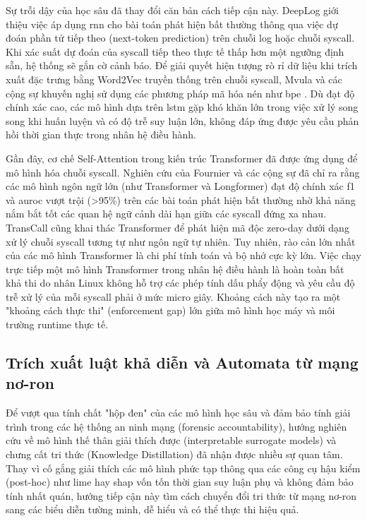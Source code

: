 \documentclass[../main.tex]{subfiles}
\begin{document}
Sự trỗi dậy của học sâu đã thay đổi căn bản cách tiếp cận này.
DeepLog \cite{du2017deeplog} giới thiệu việc áp dụng \gls{rnn} \cite{hochreiter1997lstm} cho bài toán phát hiện bất thường thông qua việc dự
đoán phần tử tiếp theo (next-token prediction) trên chuỗi log hoặc
chuỗi \gls{syscall}. Khi xác suất dự đoán của \gls{syscall} tiếp theo thực tế
thấp hơn một ngưỡng định sẵn, hệ thống sẽ gắn cờ cảnh báo. Để giải
quyết hiện tượng rò rỉ dữ liệu khi trích xuất đặc trưng bằng Word2Vec
\cite{mikolov2013word2vec} truyền thống trên chuỗi \gls{syscall}, Mvula và các cộng sự
\cite{mvula2023evaluating} khuyến nghị sử dụng các phương pháp mã hóa
nén như \gls{bpe} \cite{sennrich2016bpe}. Dù đạt độ chính xác cao, các mô
hình dựa trên \gls{lstm} gặp khó khăn lớn trong việc xử lý song song khi
huấn luyện và có độ trễ suy luận lớn, không đáp ứng được yêu cầu phản
hồi thời gian thực trong nhân hệ điều hành.

Gần đây, cơ chế Self-Attention trong kiến trúc Transformer đã được
ứng dụng để mô hình hóa chuỗi \gls{syscall}. Nghiên cứu của Fournier và các
cộng sự \cite{fournier2023language} đã chỉ ra rằng các mô hình ngôn
ngữ lớn (như Transformer và Longformer) đạt độ chính xác \gls{f1} và \gls{auroc}
vượt trội (>95\%) trên các bài toán phát hiện bất thường nhờ khả năng
nắm bắt tốt các quan hệ ngữ cảnh dài hạn giữa các \gls{syscall} đứng xa
nhau. TransCall \cite{alsiam2026transcall} cũng khai thác Transformer
để phát hiện mã độc zero-day dưới dạng xử lý chuỗi \gls{syscall} tương tự
như ngôn ngữ tự nhiên. Tuy nhiên, rào cản lớn nhất của các mô hình
Transformer là chi phí tính toán và bộ nhớ cực kỳ lớn. Việc chạy trực
tiếp một mô hình Transformer trong nhân hệ điều hành là hoàn toàn bất
khả thi do nhân Linux không hỗ trợ các phép tính dấu phẩy động và yêu
cầu độ trễ xử lý của mỗi \gls{syscall} phải ở mức micro giây. Khoảng cách
này tạo ra một "khoảng cách thực thi" (enforcement gap) lớn giữa mô
hình học máy và môi trường runtime thực tế.

\subsection{Trích xuất luật khả diễn và Automata từ mạng nơ-ron}
Để vượt qua tính chất "hộp đen" của các mô hình học sâu và đảm bảo
tính giải trình trong các hệ thống an ninh mạng (forensic
accountability), hướng nghiên cứu về mô hình thế thân giải thích được
(interpretable surrogate models) và chưng cất tri thức (Knowledge
Distillation) đã nhận được nhiều sự quan tâm. Thay vì cố gắng giải
thích các mô hình phức tạp thông qua các công cụ hậu kiểm (post-hoc)
như \gls{lime} \cite{ribeiro2016lime} hay \gls{shap} \cite{lundberg2017shap} vốn tốn thời gian suy luận phụ và không đảm bảo
tính nhất quán, hướng tiếp cận này tìm cách chuyển đổi tri thức từ
mạng nơ-ron sang các biểu diễn tường minh, dễ hiểu và có thể thực thi hiệu quả.
\end{document}
